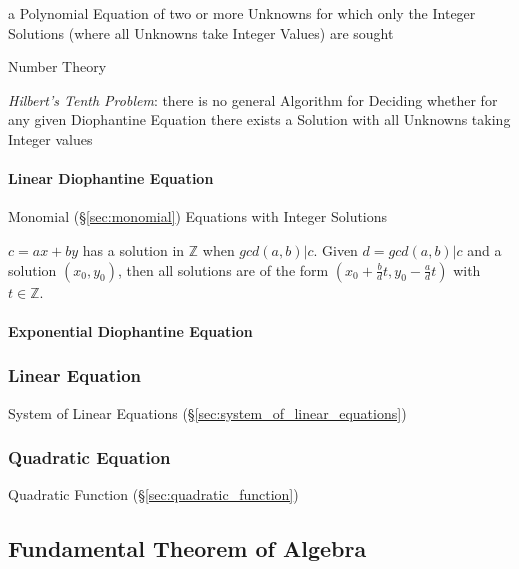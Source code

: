 a Polynomial Equation of two or more Unknowns for which only the Integer
Solutions (where all Unknowns take Integer Values) are sought

\fist Number Theory

\emph{Hilbert's Tenth Problem}: there is no general Algorithm for Deciding
whether for any given Diophantine Equation there exists a Solution with all
Unknowns taking Integer values



\paragraph{Linear Diophantine Equation}
\label{sec:linear_diophantine}\hfill

Monomial (\S\ref{sec:monomial}) Equations with Integer Solutions

$c = ax + by$ has a solution in $\mathbb{Z}$ when $gcd(a,b)|c$. Given
$d=gcd(a,b)|c$ and a solution $(x_0, y_0)$, then all solutions are of
the form $(x_0 + \frac{b}{d}t, y_0 - \frac{a}{d}t)$ with $t \in
\mathbb{Z}$.



\paragraph{Exponential Diophantine Equation}\hfill
\label{sec:exponential_diophantine}



\subsubsection{Linear Equation}\label{sec:linear_equation}

System of Linear Equations (\S\ref{sec:system_of_linear_equations})



\subsubsection{Quadratic Equation}\label{sec:quadratic_equation}

Quadratic Function (\S\ref{sec:quadratic_function})



\subsection{Fundamental Theorem of Algebra}
\label{sec:fundamental_algebra_theorem}

